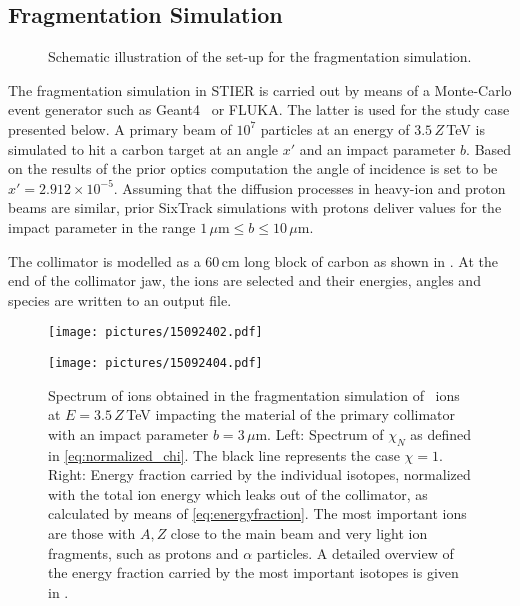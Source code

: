 \subsection{Fragmentation Simulation}
%
\begin{figure}[htb]
  \centering
   \def\svgwidth{0.65\linewidth}
   
  \caption{Schematic illustration of the set-up for the fragmentation simulation.}
  \label{pic:14112701}
\end{figure}
%
The fragmentation simulation in STIER is carried out by means of a Monte-Carlo event generator such as Geant4~\cite{Agostinelli2003250,1610988} or \textsc{FLUKA}. The latter is used for the study case presented below. A primary \lead beam of $10^7$ particles at an energy of $3.5\,Z\,$TeV is simulated to hit a carbon target at an angle $x'$ and an impact parameter $b$. Based on the results of the prior optics computation the angle of incidence is set to be $x'=2.912\times 10^{-5}$. Assuming that the diffusion processes in heavy-ion and proton beams are similar, prior SixTrack simulations with protons deliver values for the impact parameter in the range $1\,\mu \text{m} \leq b \leq 10\,\mu$m. 

The collimator is modelled as a 60$\,$cm long block of carbon as shown in . At the end of the collimator jaw, the ions are selected and their energies, angles and species are written to an output file. 

\begin{figure*}[t]
\begin{minipage}[t]{0.495\textwidth}
\texttt{[image: pictures/15092402.pdf]}
\end{minipage}
\begin{minipage}[t]{0.495\textwidth}
\texttt{[image: pictures/15092404.pdf]}
\end{minipage}
\caption{Spectrum of ions obtained in the fragmentation simulation of \lead~ions at $E=3.5\,Z\,$TeV impacting the material of the primary collimator with an impact parameter $b=3\,\mu$m. Left: Spectrum of $\chi_N$ as defined in \eqref{eq:normalized_chi}. The black line represents the case $\chi=1$. Right: Energy fraction carried by the individual isotopes, normalized with the total ion energy which leaks out of the collimator, as calculated by means of \eqref{eq:energyfraction}. The most important ions are those with $A,Z$ close to the main beam and very light ion fragments, such as protons and $\alpha$ particles. A detailed overview of the energy fraction carried by the most important isotopes is given in .}
\label{fig:stier_fragmentation}
\end{figure*}

